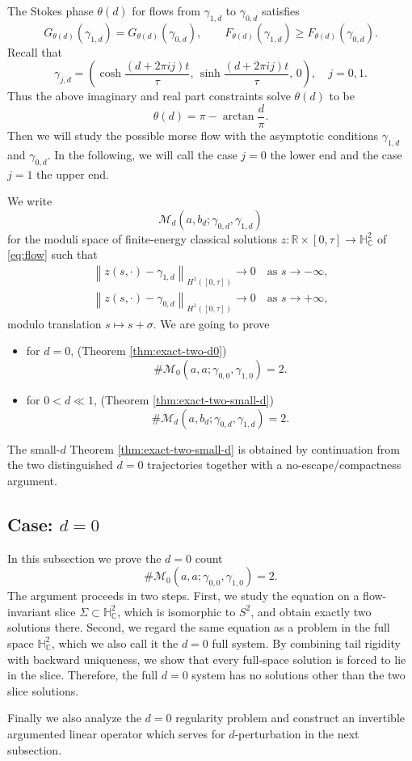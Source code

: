 \documentclass[11pt]{amsart}
\theoremstyle{plain}
\theoremstyle{definition}
\newcommand{\R}{\mathbb{R}}
\newcommand{\C}{\mathbb{C}}
\newcommand{\Norm}[1]{\left\lVert #1\right\rVert}
\newcommand{\HH}{\mathbb{H}}
\begin{document}
The Stokes phase $\theta(d)$ for flows from $\gamma_{1,d}$ to $\gamma_{0,d}$ satisfies 
\[G_{\theta(d)}(\gamma_{1,d})=G_{\theta(d)}(\gamma_{0,d}),\qquad F_{\theta(d)}(\gamma_{1,d})\ge F_{\theta(d)}(\gamma_{0,d}).\]
Recall that
\[\gamma_{j,d}=\left(\cosh \frac{(d+2\pi ij)t}{\tau},\,\sinh \frac{(d+2\pi ij)t}{\tau},\,0 \right), \quad j=0,1.\]
Thus the above imaginary and real part constraints solve $\theta(d)$ to be
\begin{equation}\label{eq:thetad}
\theta(d)=\pi-\arctan\frac{d}{\pi}.    
\end{equation}
Then we will study the possible morse flow with the asymptotic conditions $\gamma_{1,d}$ and $\gamma_{0,d}$. In the following, we will call the case $j=0$ the lower end and the case $j=1$ the upper end. 


\vskip 0.2cm

We write
\[
\mathcal{M}_d(a,b_d;\gamma_{0,d},\gamma_{1,d})
\]
for the moduli space of finite-energy classical solutions $z:\R\times[0,\tau]\to \HH_{\C}^2$ of \eqref{eq:flow} such that
\begin{align*}
\Norm{z(s,\cdot)-\gamma_{1,d}}_{H^1([0,\tau])}\to 0\quad\text{as }s\to -\infty,
\\
\Norm{z(s,\cdot)-\gamma_{0,d}}_{H^1([0,\tau])}\to 0\quad\text{as }s\to +\infty,
\end{align*}
modulo translation $s\mapsto s+\sigma$. We are going to prove
\begin{itemize}
    \item for $d=0$, (Theorem \ref{thm:exact-two-d0})
    \[
\#\mathcal{M}_0(a,a;\gamma_{0,0},\gamma_{1,0})=2.
\]
   \item for $0<d\ll1$, (Theorem \ref{thm:exact-two-small-d})
   \[
\#\mathcal{M}_d(a,b_d;\gamma_{0,d},\gamma_{1,d})=2.
\]
\end{itemize}
The small-$d$ Theorem \ref{thm:exact-two-small-d} is obtained by continuation from the two distinguished $d=0$ trajectories together with a no-escape/compactness argument.


\subsection{Case: $d=0$}\label{sec:case d=0}
{
In this subsection we prove the $d=0$ count
\[
\#\mathcal M_0(a,a;\gamma_{0,0},\gamma_{1,0})=2.
\]
The argument proceeds in two steps. First, we study the equation on a flow-invariant slice
$\Sigma \subset \mathbb H^2_{\mathbb C}$, which is isomorphic to $S^2$, and obtain exactly two solutions there. Second, we regard the same equation as a problem in the full space $\mathbb H^2_{\mathbb C}$, which we also call it the $d=0$ full system. By combining tail rigidity with backward uniqueness, we show that every full-space solution is forced to lie in the slice. Therefore, the full $d=0$ system has no solutions other than the two slice solutions. 

Finally we also analyze the $d=0$ regularity problem and construct an invertible argumented linear operator which serves for $d$-perturbation in the next subsection.}
 
\end{document}
